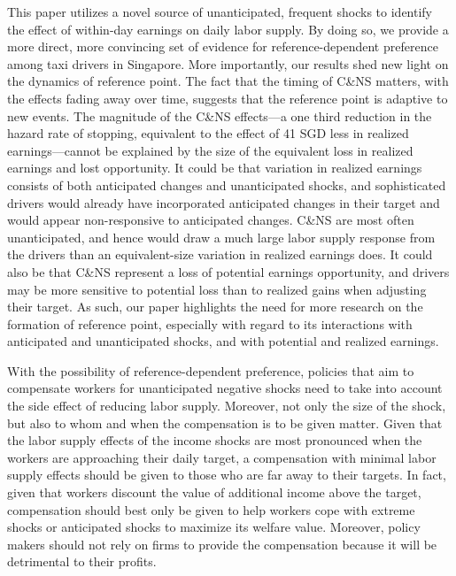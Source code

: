 \documentclass[reviewmode,AEJ]{AEA}
\begin{document}
This paper utilizes a novel source of unanticipated, frequent shocks to identify the effect of within-day 
earnings on daily labor supply. By doing so, we provide a more direct, more convincing set of evidence for 
reference-dependent preference among taxi drivers in Singapore. More importantly, our results shed new light 
on the dynamics of reference point. The fact that the timing of C\&NS matters, with the effects fading away
over time, suggests that the reference point is adaptive to new events. The magnitude of the C\&NS effects---a
one third reduction in the hazard rate of stopping, equivalent to the effect of 41 SGD less in realized 
earnings---cannot be explained by the size of the equivalent loss in realized earnings and lost opportunity.
It could be that variation 
in realized earnings consists of both anticipated changes and unanticipated shocks, and sophisticated drivers 
would already have incorporated anticipated changes in their target and would appear non-responsive to
anticipated changes. C\&NS are most often unanticipated, and hence would draw a much large labor supply 
response from the drivers than an equivalent-size variation in realized earnings does. It could also be
that C\&NS represent a loss of potential earnings opportunity, and drivers may be more sensitive to potential
loss than to realized gains when adjusting their target. As such, our paper highlights the need for more research
on the formation of reference point, especially with regard to its interactions with anticipated and
unanticipated shocks, and with potential and realized earnings.


With the possibility of reference-dependent preference, policies that aim to compensate workers for unanticipated negative shocks need to take into account the side effect of reducing labor supply. Moreover, not only the size of the shock, but also to whom and when the compensation is to be given matter. Given that the labor supply effects of the income shocks are most pronounced when the workers are approaching their daily target, a compensation with minimal labor supply effects should be given to those who are far away to their targets. In fact, given that workers discount the value of additional income above the target, compensation should best only be given to help workers cope with extreme shocks or anticipated shocks to maximize its welfare value. Moreover, policy makers should not rely on firms to provide the compensation because it will be detrimental to their profits.

\newpage
\end{document}

